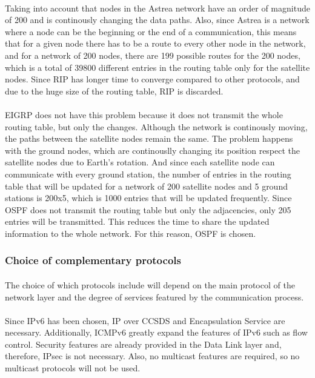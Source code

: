 \paragraph{}Taking into account that nodes in the Astrea network have an order of magnitude of 200 and is continously changing the data paths. Also, since Astrea is a network where a node can be the beginning or the end of a communication, this means that for a given node there has to be a route to every other node in the network, and for a network of 200 nodes, there are 199 possible routes for the 200 nodes, which is a total of 39800 different entries in the routing table only for the satellite nodes. Since RIP has longer time to converge compared to other protocols, and due to the huge size of the routing table, RIP is discarded.
\paragraph{}EIGRP does not have this problem because it does not transmit the whole routing table, but only the changes. Although the network is continously moving, the paths between the satellite nodes remain the same. The problem happens with the ground nodes, which are continouslly changing its position respect the satellite nodes due to Earth's rotation. And since each satellite node can communicate with every ground station, the number of entries in the routing table that will be updated for a network of 200 satellite nodes and 5 ground stations is 200x5, which is 1000 entries that will be updated frequently. Since OSPF does not transmit the routing table but only the adjacencies, only 205 entries will be transmitted. This reduces the time to share the updated information to the whole network. For this reason, OSPF is chosen.

\subsubsection{Choice of complementary protocols}
\paragraph{}The choice of which protocols include will depend on the main protocol of the network layer and the degree of services featured by the communication process.
\paragraph{}Since IPv6 has been chosen, IP over CCSDS and Encapsulation Service are necessary. Additionally, ICMPv6 greatly expand the features of IPv6 such as flow control. Security features are already provided in the Data Link layer and, therefore, IPsec is not necessary. Also, no multicast features are required, so no multicast protocols will not be used.

